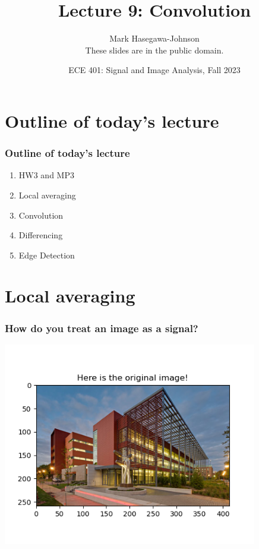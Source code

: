 \documentclass{beamer}
\title{Lecture 9: Convolution}
\author{Mark Hasegawa-Johnson\\These slides are in the public domain.}
\date{ECE 401: Signal and Image Analysis, Fall 2023}
\begin{document}
\begin{frame}
  \maketitle
\end{frame}

\begin{frame}
  \tableofcontents
\end{frame}

\section[Outline]{Outline of today's lecture}
\setcounter{subsection}{1}
\begin{frame}
  \frametitle{Outline of today's lecture}
  \begin{enumerate}
  \item HW3 and MP3
  \item Local averaging
  \item Convolution
  \item Differencing
  \item Edge Detection
  \end{enumerate}
\end{frame}

\section[Averaging]{Local averaging}
\setcounter{subsection}{1}

\begin{frame}
  \frametitle{How do you treat an image as a signal?}
  \centerline{\includegraphics[height=3.5in]{mp3fig1.png}}
\end{frame}
\end{document}
